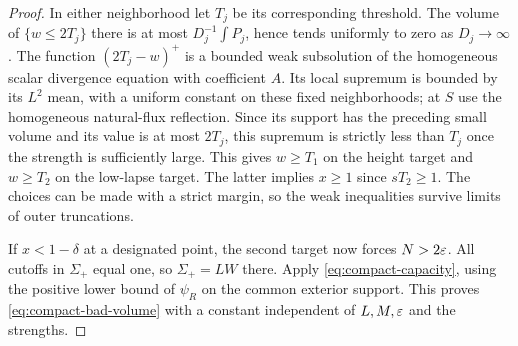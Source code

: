 \begin{proof}
In either neighborhood let $T_j$ be its corresponding threshold.
The volume of $\{w\le2T_j\}$ there is at most
$D_j^{-1}\int P_j$, hence tends uniformly to zero as $D_j\to\infty$.
The function $(2T_j-w)^+$ is a bounded weak subsolution of the
homogeneous scalar divergence equation with coefficient $A$.
Its local supremum is bounded by its $L^2$ mean, with a uniform
constant on these fixed neighborhoods; at $S$ use the homogeneous
natural-flux reflection. Since its support has the preceding small
volume and its value is at most $2T_j$, this supremum is strictly
less than $T_j$ once the strength is sufficiently large. This gives
$w\ge T_1$ on the height target and $w\ge T_2$ on the low-lapse
target. The latter implies $x\ge1$ since $sT_2\ge1$.
The choices can be made with a strict margin, so the weak inequalities
survive limits of outer truncations.

If $x<1-\delta$ at a designated point, the second target now forces
$N>2\varepsilon$. All cutoffs in $\Sigma_+$ equal one, so
$\Sigma_+=LW$ there. Apply \eqref{eq:compact-capacity}, using the
positive lower bound of $\psi_R$ on the common exterior support.
This proves \eqref{eq:compact-bad-volume} with a constant independent
of $L,M,\varepsilon$ and the strengths.
\end{proof}

